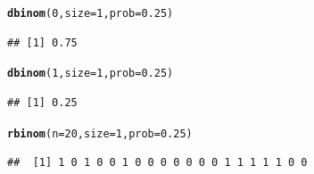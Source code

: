 \documentclass[handout]{beamer}\usepackage[]{graphicx}\usepackage[]{color}
\makeatletter
\newcommand{\hlnum}[1]{\textcolor[rgb]{0.686,0.059,0.569}{#1}}%
\newcommand{\hlstd}[1]{\textcolor[rgb]{0.345,0.345,0.345}{#1}}%
\newcommand{\hlkwc}[1]{\textcolor[rgb]{0.333,0.667,0.333}{#1}}%
\newcommand{\hlkwd}[1]{\textcolor[rgb]{0.737,0.353,0.396}{\textbf{#1}}}%
\newenvironment{kframe}{%
 \def\at@end@of@kframe{}%
 \ifinner\ifhmode%
  \def\at@end@of@kframe{\end{minipage}}%
  \begin{minipage}{\columnwidth}%
 \fi\fi%
 \def\FrameCommand##1{\hskip\@totalleftmargin \hskip-\fboxsep
 \colorbox{shadecolor}{##1}\hskip-\fboxsep
     \hskip-\linewidth \hskip-\@totalleftmargin \hskip\columnwidth}%
 \MakeFramed {\advance\hsize-\width
   \@totalleftmargin\z@ \linewidth\hsize
   \@setminipage}}%
 {\par\unskip\endMakeFramed%
 \at@end@of@kframe}
\newenvironment{knitrout}{}{} %
\theoremstyle{plain}
\theoremstyle{definition}
\makeatother
\begin{document}
\begin{frame}[fragile]

\begin{knitrout}
\color{fgcolor}\begin{kframe}
\begin{alltt}
\hlkwd{dbinom}\hlstd{(}\hlnum{0}\hlstd{,}\hlkwc{size}\hlstd{=}\hlnum{1}\hlstd{,}\hlkwc{prob}\hlstd{=}\hlnum{0.25}\hlstd{)}
\end{alltt}
\begin{verbatim}
## [1] 0.75
\end{verbatim}
\begin{alltt}
\hlkwd{dbinom}\hlstd{(}\hlnum{1}\hlstd{,}\hlkwc{size}\hlstd{=}\hlnum{1}\hlstd{,}\hlkwc{prob}\hlstd{=}\hlnum{0.25}\hlstd{)}
\end{alltt}
\begin{verbatim}
## [1] 0.25
\end{verbatim}
\begin{alltt}
\hlkwd{rbinom}\hlstd{(}\hlkwc{n}\hlstd{=}\hlnum{20}\hlstd{,}\hlkwc{size} \hlstd{=} \hlnum{1}\hlstd{,}\hlkwc{prob}\hlstd{=}\hlnum{0.25}\hlstd{)}
\end{alltt}
\begin{verbatim}
##  [1] 1 0 1 0 0 1 0 0 0 0 0 0 0 1 1 1 1 1 0 0
\end{verbatim}
\end{kframe}
\end{knitrout}

\end{frame}


\end{document}
